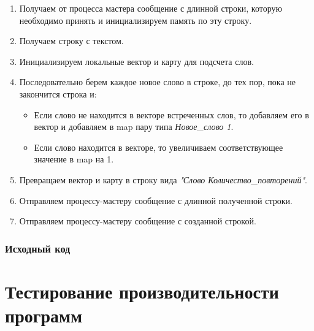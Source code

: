 \documentclass[12pt,a4paper]{report}
\begin{document}
\begin{enumerate}
							\begin{enumerate}
								\item Получаем от процесса мастера сообщение с длинной строки, которую необходимо принять и инициализируем память по эту строку.
								\item Получаем строку с текстом.
								\item Инициализируем локальные вектор и карту для подсчета слов.
								\item Последовательно берем каждое новое слово в строке, до тех пор, пока не закончится строка и:
									\begin{itemize}
										\item Если слово не находится в векторе встреченных слов, то добавляем его в вектор и добавляем в map пару типа \textit{Новое\_слово 1}.
										\item Если слово находится в векторе, то увеличиваем соответствующее значение в map на 1.
									\end{itemize}
								\item Превращаем вектор и карту в строку вида \textit{"Слово Количество\_повторений"}.
								\item Отправляем процессу-мастеру сообщение с длинной полученной строки.
								\item Отправляем процессу-мастеру сообщение с созданной строкой.
							\end{enumerate}
					\end{enumerate}
				\subsubsection{Исходный код}
					
		\section{Тестирование производительности программ}
\end{document}
